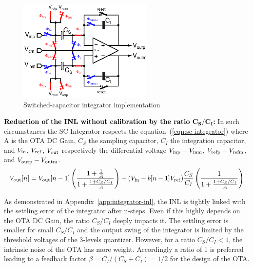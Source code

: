 \begin{figure}[htp]
	\centering
	\includegraphics[width=0.6\textwidth]{Chapter4/Figs/sc-integrator-isd.ps}
	\caption{Switched-capacitor integrator implementation}
	\label{fig:isd-sc-integrator}
\end{figure}

\textbf{\textcolor{black}{Reduction of the INL without calibration by the ratio $\mathbf{C_S/C_I}$:}}
In such circumstances the SC-Integrator respects the equation~(\ref{eqn:sc-integrator}) where A is the OTA DC Gain, \(C_S \) the sampling capacitor, \(C_I \) the integration capacitor, and \(V_{\rm in} \), \(V_{\rm ref} \), \(V_{\rm out} \) respectively the differential voltage \(V_{\rm inp}-V_{\rm inm} \), \(V_{\rm refp}-V_{\rm refm} \), and \(V_{\rm outp}-V_{\rm outm} \).
\begin{equation}
    \label{eqn:sc-integrator}
    V_{\rm out}[n] = V_{\rm out}[n-1] \left(\frac{1+\frac{1}{A}}{1+\frac{1+C_S/C_I}{A}}\right) + (V_{\rm in}-b[n-1]V_{\rm ref})\frac{C_S}{C_I}\left(\frac{1}{1+\frac{1+C_S/C_I}{A}}\right)
\end{equation}

As demonstrated in Appendix~\ref{app:integrator-inl}, the INL is tightly linked with the settling error of the integrator after n-steps. Even if this highly depends on the OTA DC Gain, the ratio \(C_S/C_I \) deeply impacts it. The settling error is smaller for small \(C_S/C_I \) and the output swing of the integrator is limited by the threshold voltages of the 3-levels quantizer. However, for a ratio \(C_S/C_I < 1\), the intrinsic noise of the OTA has more weight. Accordingly a ratio of 1 is preferred leading to a feedback factor \(\beta = C_I/(C_S+C_I) = 1/2 \) for the design of the OTA\@.


